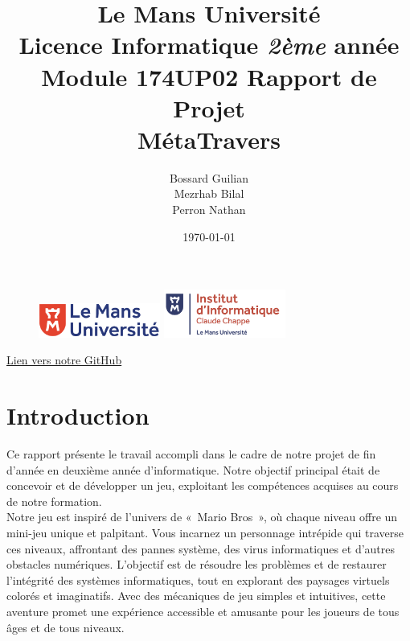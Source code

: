 \documentclass[12pt,a4paper]{article}
\begin{document}
    \begin{figure}
 
        \includegraphics[width=4cm]{images/logolemansU.png}
        \hspace{150pt}
        \includegraphics[width=4cm]{images/logo_IC2.png}
        
    \end{figure}
    
    \title{
        \color{blue}\textbf{Le Mans Université}\\
        \color{black}Licence Informatique \textit{2ème} année\\
        Module 174UP02 Rapport de Projet\\
        \textbf{MétaTravers}
    }
    
    \author{Bossard Guilian\\Mezrhab Bilal\\Perron Nathan}
    \date{\today}
    \maketitle
    \begin{center}
        \href{https://github.com/Slyolas/projetL2.git}{Lien vers notre GitHub}
    \end{center}
    \newpage

    \tableofcontents

    \newpage

    \section{Introduction}
        \tabto{1cm} Ce rapport présente le travail accompli dans le cadre de notre projet de fin d'année en deuxième année d'informatique. Notre objectif principal était de concevoir et de développer un jeu, exploitant les compétences acquises au cours de notre formation. \\
        
            \tabto{1cm} Notre jeu est inspiré de l'univers de «~Mario Bros~», où chaque niveau offre un mini-jeu unique et palpitant. Vous incarnez un personnage intrépide qui traverse ces niveaux, affrontant des pannes système, des virus informatiques et d'autres obstacles numériques. L'objectif est de résoudre les problèmes et de restaurer l'intégrité des systèmes informatiques, tout en explorant des paysages virtuels colorés et imaginatifs. Avec des mécaniques de jeu simples et intuitives, cette aventure promet une expérience accessible et amusante pour les joueurs de tous âges et de tous niveaux.\\\\
             
\end{document}
